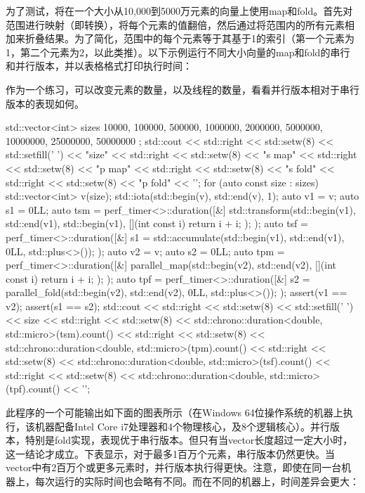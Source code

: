 为了测试，将在一个大小从10,000到5000万元素的向量上使用map和fold。首先对范围进行映射（即转换），将每个元素的值翻倍，然后通过将范围内的所有元素相加来折叠结果。为了简化，范围中的每个元素等于其基于1的索引（第一个元素为1，第二个元素为2，以此类推）。以下示例运行不同大小向量的map和fold的串行和并行版本，并以表格格式打印执行时间：

\begin{myNotic}
作为一个练习，可以改变元素的数量，以及线程的数量，看看并行版本相对于串行版本的表现如何。
\end{myNotic}

\begin{cpp}
std::vector<int> sizes
{
    10000, 100000, 500000,
    1000000, 2000000, 5000000,
    10000000, 25000000, 50000000
};
std::cout
    << std::right << std::setw(8) << std::setfill(' ') << "size"
    << std::right << std::setw(8) << "s map"
    << std::right << std::setw(8) << "p map"
    << std::right << std::setw(8) << "s fold"
    << std::right << std::setw(8) << "p fold"
    << '\n';
for (auto const size : sizes)
{
    std::vector<int> v(size);
    std::iota(std::begin(v), std::end(v), 1);
    auto v1 = v;
    auto s1 = 0LL;
    auto tsm = perf_timer<>::duration([&] {
        std::transform(std::begin(v1), std::end(v1), std::begin(v1),
        [](int const i) {return i + i; }); });
    auto tsf = perf_timer<>::duration([&] {
        s1 = std::accumulate(std::begin(v1), std::end(v1), 0LL,
                             std::plus<>()); });
    auto v2 = v;
    auto s2 = 0LL;
    auto tpm = perf_timer<>::duration([&] {
        parallel_map(std::begin(v2), std::end(v2),
        [](int const i) {return i + i; }); });
    auto tpf = perf_timer<>::duration([&] {
        s2 = parallel_fold(std::begin(v2), std::end(v2), 0LL,
                           std::plus<>()); });
    assert(v1 == v2);
    assert(s1 == s2);
    std::cout
        << std::right << std::setw(8) << std::setfill(' ') << size
        << std::right << std::setw(8)
        << std::chrono::duration<double, std::micro>(tsm).count()
        << std::right << std::setw(8)
        << std::chrono::duration<double, std::micro>(tpm).count()
        << std::right << std::setw(8)
        << std::chrono::duration<double, std::micro>(tsf).count()
        << std::right << std::setw(8)
        << std::chrono::duration<double, std::micro>(tpf).count()
        << '\n';
}
\end{cpp}

此程序的一个可能输出如下面的图表所示（在Windows 64位操作系统的机器上执行，该机器配备Intel Core i7处理器和4个物理核心，及8个逻辑核心）。并行版本，特别是fold实现，表现优于串行版本。但只有当vector长度超过一定大小时，这一结论才成立。下表显示，对于最多1百万个元素，串行版本仍然更快。当vector中有2百万个或更多元素时，并行版本执行得更快。注意，即使在同一台机器上，每次运行的实际时间也会略有不同。而在不同的机器上，时间差异会更大：

